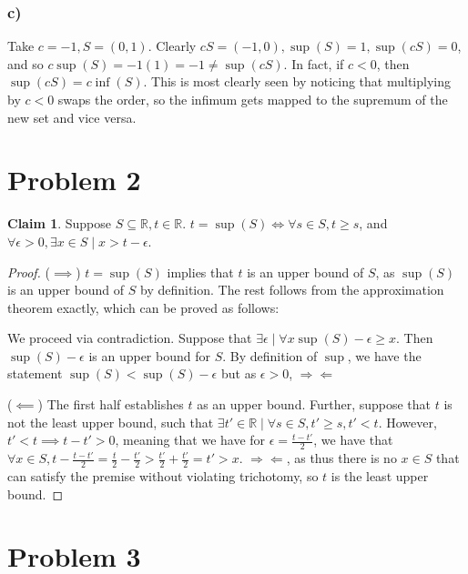 \documentclass[12pt,letterpaper]{article}
\theoremstyle{definition}
\newtheorem*{claim}{Claim}
\newcommand{\contra}{\Rightarrow\!\Leftarrow}
\newcommand{\R}{\mathbb{R}}
\begin{document}
\subsubsection*{c)}

Take $c = -1, S = (0,1)$. Clearly $cS = (-1,0), \sup(S) = 1, \sup(cS) = 0$, and
so $c\sup(S) = -1(1) = -1 \neq \sup(cS)$. In fact, if $c<0$, then $\sup(cS) =
c\inf(S)$. This is most clearly seen by noticing that multiplying by $c < 0$
swaps the order, so the infimum gets mapped to the supremum of the new set and
vice versa.

\section*{Problem 2}

\begin{claim}
  Suppose $S \subseteq \R, t \in \R$. $t = \sup(S) \iff \forall s \in S, t \geq
  s$, and $\forall \epsilon > 0, \exists x \in S \mid x > t - \epsilon$.
\end{claim}

\begin{proof}
  ($\implies$) $t = \sup(S)$ implies that $t$ is an upper bound of $S$, as
  $\sup(S)$ is an upper bound of $S$ by definition. The rest follows from the
  approximation theorem exactly, which can be proved as follows: 

  We proceed via contradiction. Suppose that $\exists \epsilon \mid \forall x \sup(S) - \epsilon \geq x$.
  Then $\sup(S) - \epsilon$ is an upper bound for $S$.
  By definition of $\sup$, we have the statement $\sup(S) < \sup (S) - \epsilon$
  but as $\epsilon > 0$, $\contra$

  ($\impliedby$) The first half establishes $t$ as an upper bound. Further,
  suppose that $t$ is not the least upper bound, such that $\exists t'  \in \R \mid
  \forall s \in S, t' \geq s, t' < t$. However, $t' < t \implies t - t' > 0$,
  meaning that we have for $\epsilon = \frac{t - t'}{2}$, we have that $\forall x \in
  S, t - \frac{t - t'}{2} = \frac{t}{2} - \frac{t'}{2} > \frac{t'}{2} +
  \frac{t'}{2} = t' > x$. $\contra$, as thus there is no $x \in S$
  that can satisfy the premise without violating trichotomy, so $t$ is the least upper bound.
\end{proof}

\section*{Problem 3}
\end{document}
